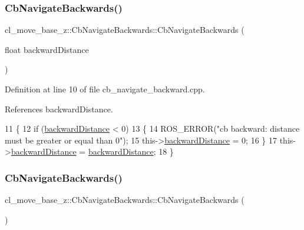 \subsubsection{\texorpdfstring{Cb\+Navigate\+Backwards()}{CbNavigateBackwards()}\hspace{0.1cm}{\footnotesize\ttfamily [1/2]}}
{\footnotesize\ttfamily cl\+\_\+move\+\_\+base\+\_\+z\+::\+Cb\+Navigate\+Backwards\+::\+Cb\+Navigate\+Backwards (\begin{DoxyParamCaption}\item[{float}]{backward\+Distance }\end{DoxyParamCaption})}



Definition at line 10 of file cb\+\_\+navigate\+\_\+backward.\+cpp.



References backward\+Distance.


\begin{DoxyCode}
11 \{
12     \textcolor{keywordflow}{if} (\hyperlink{classcl__move__base__z_1_1CbNavigateBackwards_abb7099e4e18602f6cf06c4f5534a2a15}{backwardDistance} < 0)
13     \{
14         ROS\_ERROR(\textcolor{stringliteral}{"cb backward: distance must be greater or equal than 0"});
15         this->\hyperlink{classcl__move__base__z_1_1CbNavigateBackwards_abb7099e4e18602f6cf06c4f5534a2a15}{backwardDistance} = 0;
16     \}
17     this->\hyperlink{classcl__move__base__z_1_1CbNavigateBackwards_abb7099e4e18602f6cf06c4f5534a2a15}{backwardDistance} = \hyperlink{classcl__move__base__z_1_1CbNavigateBackwards_abb7099e4e18602f6cf06c4f5534a2a15}{backwardDistance};
18 \}
\end{DoxyCode}
\mbox{\label{classcl__move__base__z_1_1CbNavigateBackwards_a1329e851a242a12e80c6364c02651b70}} 
\subsubsection{\texorpdfstring{Cb\+Navigate\+Backwards()}{CbNavigateBackwards()}\hspace{0.1cm}{\footnotesize\ttfamily [2/2]}}
{\footnotesize\ttfamily cl\+\_\+move\+\_\+base\+\_\+z\+::\+Cb\+Navigate\+Backwards\+::\+Cb\+Navigate\+Backwards (\begin{DoxyParamCaption}{ }\end{DoxyParamCaption})}



